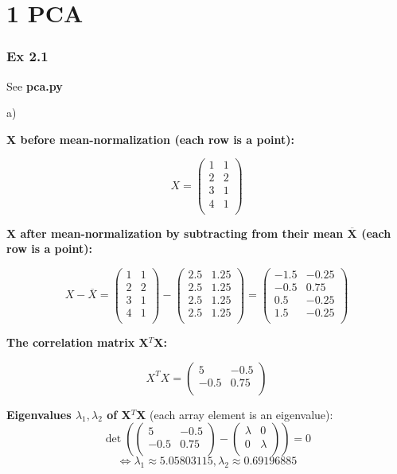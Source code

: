 \documentclass{article}
\begin{document}
\section*{1 PCA}
\subsubsection*{Ex 2.1}

See \textbf{pca.py}

a)

\textbf{X before mean-normalization (each row is a point):}

$$X = \begin{pmatrix}
1 & 1 \\
2 & 2 \\
3 & 1 \\
4 & 1\\
\end{pmatrix}$$
 

\textbf{X after mean-normalization by subtracting from their mean $\overline{\textbf{X}}$ (each row is a point):}

$$X - \overline{X} = 
\begin{pmatrix}
1 & 1 \\
2 & 2 \\
3 & 1 \\
4 & 1\\
\end{pmatrix} -
\begin{pmatrix}
2.5 & 1.25 \\
2.5 & 1.25 \\
2.5 & 1.25 \\
2.5 & 1.25 \\
\end{pmatrix} = 
\begin{pmatrix}
-1.5 & -0.25 \\
-0.5 & 0.75 \\
0.5 & -0.25 \\
1.5 & -0.25 \\
\end{pmatrix}
$$

\textbf{The correlation matrix X$^T$X:}

$$X^T X = 
\begin{pmatrix}
5 & -0.5 \\
-0.5 & 0.75 \\
\end{pmatrix}
$$

\textbf{Eigenvalues $\lambda_1, \lambda_2$ of X$^T$X} (each array element is an eigenvalue): 
$$\det \left( 
\begin{pmatrix} 
5 & -0.5 \\
-0.5 & 0.75 \\
\end{pmatrix} - 
\begin{pmatrix} 
\lambda & 0 \\
0 & \lambda \\
\end{pmatrix}
 \right) = 0$$
 $$\Leftrightarrow \lambda_1 \approx  5.05803115, \lambda_2 \approx 0.69196885$$
\end{document}
